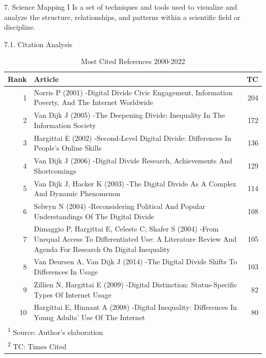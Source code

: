 \documentclass[
  ignorenonframetext,
]{beamer}
\begin{document}
\begin{frame}{7. Science Mapping I}
\protect\hypertarget{science-mapping-i}{}
Is a set of techniques and tools used to visualize and analyze the
structure, relationships, and patterns within a scientific field or
discipline.

\begin{block}{7.1. Citation Analysis}
\protect\hypertarget{citation-analysis}{}
\begin{table}[!h]

\caption{\label{tab:Most cited refs}Most Cited References 2000-2022}
\centering
\fontsize{5}{7}\selectfont
\begin{tabular}[t]{r|p{9cm}|r}
\hline
\textbf{Rank} & \textbf{Article} & \textbf{TC}\\
\hline
1 & Norris P (2001) -Digital Divide Civic Engagement, Information Poverty, And The Internet Worldwide & 204\\
\hline
2 & Van Dijk J (2005) -The Deepening Divide: Inequality In The Information Society & 172\\
\hline
3 & Hargittai E (2002) -Second-Level Digital Divide: Differences In People's Online Skills & 136\\
\hline
4 & Van Dijk J (2006) -Digital Divide Research, Achievements And Shortcomings & 129\\
\hline
5 & Van Dijk J, Hacker K (2003) -The Digital Divide As A Complex And Dynamic Phenomenon & 114\\
\hline
6 & Selwyn N (2004) -Reconsidering Political And Popular Understandings Of The Digital Divide & 108\\
\hline
7 & Dimaggio P, Hargittai E, Celeste C, Shafer S (2004) -From Unequal Access To Differentiated Use: A Literature Review And Agenda For Research On Digital Inequality & 105\\
\hline
8 & Van Deursen A, Van Dijk J (2014) -The Digital Divide Shifts To Differences In Usage & 103\\
\hline
9 & Zillien N, Hargittai E (2009) -Digital Distinction: Status-Specific Types Of Internet Usage & 82\\
\hline
10 & Hargittai E, Hinnant A (2008) -Digital Inequality: Differences In Young Adults' Use Of The Internet & 80\\
\hline
\multicolumn{3}{l}{\textsuperscript{1} Source: Author's elaboration}\\
\multicolumn{3}{l}{\textsuperscript{2} TC: Times Cited}\\
\end{tabular}
\end{table}
\end{block}
\end{frame}
\end{document}
